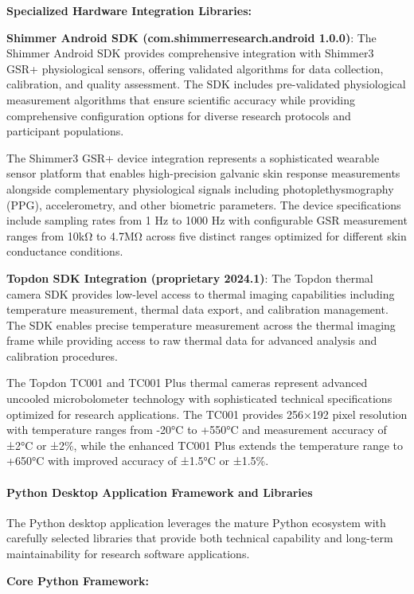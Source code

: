 \documentclass[12pt,a4paper]{report}
\begin{document}
\textbf{Specialized Hardware Integration Libraries:}

\textbf{Shimmer Android SDK (com.shimmerresearch.android 1.0.0)}: The Shimmer Android SDK provides comprehensive integration
with Shimmer3 GSR+ physiological sensors, offering validated algorithms for data collection, calibration, and quality
assessment. The SDK includes pre-validated physiological measurement algorithms that ensure scientific accuracy while
providing comprehensive configuration options for diverse research protocols and participant populations.

The Shimmer3 GSR+ device integration represents a sophisticated wearable sensor platform that enables high-precision
galvanic skin response measurements alongside complementary physiological signals including photoplethysmography (PPG),
accelerometry, and other biometric parameters. The device specifications include sampling rates from 1 Hz to 1000 Hz
with configurable GSR measurement ranges from 10kΩ to 4.7MΩ across five distinct ranges optimized for different skin
conductance conditions.

\textbf{Topdon SDK Integration (proprietary 2024.1)}: The Topdon thermal camera SDK provides low-level access to thermal
imaging capabilities including temperature measurement, thermal data export, and calibration management. The SDK enables
precise temperature measurement across the thermal imaging frame while providing access to raw thermal data for advanced
analysis and calibration procedures.

The Topdon TC001 and TC001 Plus thermal cameras represent advanced uncooled microbolometer technology with sophisticated
technical specifications optimized for research applications. The TC001 provides 256×192 pixel resolution with
temperature ranges from -20°C to +550°C and measurement accuracy of ±2°C or ±2\%, while the enhanced TC001 Plus extends
the temperature range to +650°C with improved accuracy of ±1.5°C or ±1.5\%.

\paragraph{Python Desktop Application Framework and Libraries}

The Python desktop application leverages the mature Python ecosystem with carefully selected libraries that provide both
technical capability and long-term maintainability for research software applications.

\textbf{Core Python Framework:}
\end{document}

